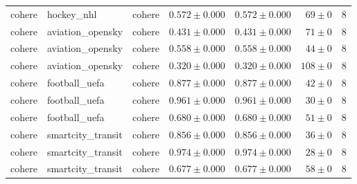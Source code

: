\begin{table}[htbp]
\begin{tabular}{l l l r r r r}
cohere & hockey\_nhl & cohere & $0.572\pm0.000$ & $0.572\pm0.000$ & $69\pm0$ & 8 \\
cohere & aviation\_opensky & cohere & $0.431\pm0.000$ & $0.431\pm0.000$ & $71\pm0$ & 8 \\
cohere & aviation\_opensky & cohere & $0.558\pm0.000$ & $0.558\pm0.000$ & $44\pm0$ & 8 \\
cohere & aviation\_opensky & cohere & $0.320\pm0.000$ & $0.320\pm0.000$ & $108\pm0$ & 8 \\
cohere & football\_uefa & cohere & $0.877\pm0.000$ & $0.877\pm0.000$ & $42\pm0$ & 8 \\
cohere & football\_uefa & cohere & $0.961\pm0.000$ & $0.961\pm0.000$ & $30\pm0$ & 8 \\
cohere & football\_uefa & cohere & $0.680\pm0.000$ & $0.680\pm0.000$ & $51\pm0$ & 8 \\
cohere & smartcity\_transit & cohere & $0.856\pm0.000$ & $0.856\pm0.000$ & $36\pm0$ & 8 \\
cohere & smartcity\_transit & cohere & $0.974\pm0.000$ & $0.974\pm0.000$ & $28\pm0$ & 8 \\
cohere & smartcity\_transit & cohere & $0.677\pm0.000$ & $0.677\pm0.000$ & $58\pm0$ & 8 \\
\hline
\end{tabular}
\end{table}
